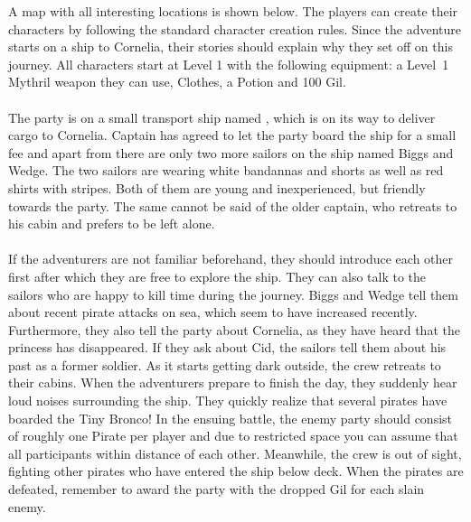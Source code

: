 A map with all interesting locations is shown below.
The players can create their characters by following the standard character creation rules.
Since the adventure starts on a ship to Cornelia, their stories should explain why they set off on this journey.
All characters start at Level 1 with the following equipment: a Level~1 Mythril weapon they can use, Clothes, a Potion and 100 Gil.
%
\ofpar
%
\\\\
%
The party is on a small transport ship named , which is on its way to deliver cargo to Cornelia.
Captain has agreed to let the party board the ship for a small fee and apart from there are only two more sailors on the ship named Biggs and Wedge.
The two sailors are wearing white bandannas and shorts as well as red shirts with stripes. 
Both of them are young and inexperienced, but friendly towards the party.
The same cannot be said of the older captain, who retreats to his cabin and prefers to be left alone.
%
\ofpar
%
\\\\
%
If the adventurers are not familiar beforehand, they should introduce each other first after which they are free to explore the ship.
They can also talk to the sailors who are happy to kill time during the journey.
Biggs and Wedge tell them about recent pirate attacks on sea, which seem to have increased recently.
Furthermore, they also tell the party about Cornelia, as they have heard that the princess has disappeared.
If they ask about Cid, the sailors tell them about his past as a former soldier. 
As it starts getting dark outside, the crew retreats to their cabins.
When the adventurers prepare to finish the day, they suddenly hear loud noises surrounding the ship.
They quickly realize that several pirates have boarded the Tiny Bronco!
In the ensuing battle, the enemy party should consist of roughly one Pirate per player and due to restricted space 
you can assume that all participants within distance of each other.
Meanwhile, the crew is out of sight, fighting other pirates who have entered the ship below deck.
When the pirates are defeated, remember to award the party with the dropped Gil for each slain enemy.
%
\vfill
%
